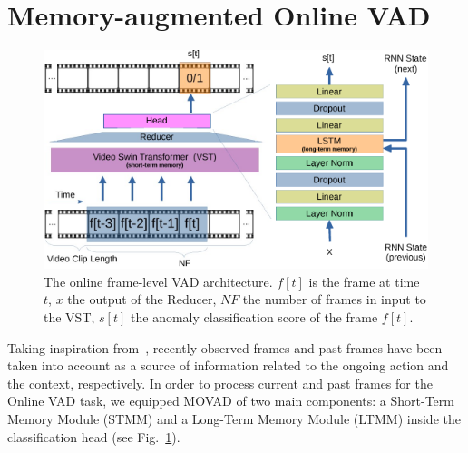 \section{Memory-augmented Online VAD}
\label{sec:theory}

\fboxsep=1mm%
\fboxrule=1pt%

\begin{figure}[!t]
            \centerline{\includegraphics[clip, width=\linewidth]{images/arch-rx-cropped.pdf}}
        \caption{The online frame-level VAD architecture. $f[t]$ is the frame at time $t$, $x$ the output of the Reducer, $\mathit{NF}$ the number of frames in input to the VST, $s[t]$ the anomaly classification score of the frame $f[t]$.\label{fig:arch}}
\end{figure}

Taking inspiration from~\cite{xu2021long}, recently observed frames and past frames have been taken into account as a source of information related to the ongoing action and the context, respectively.
In order to process current and past frames for the Online VAD task, we equipped MOVAD of two main components: a Short-Term Memory Module (STMM) and a Long-Term Memory Module (LTMM) inside the classification head (see Fig.~\ref{fig:arch}). 

